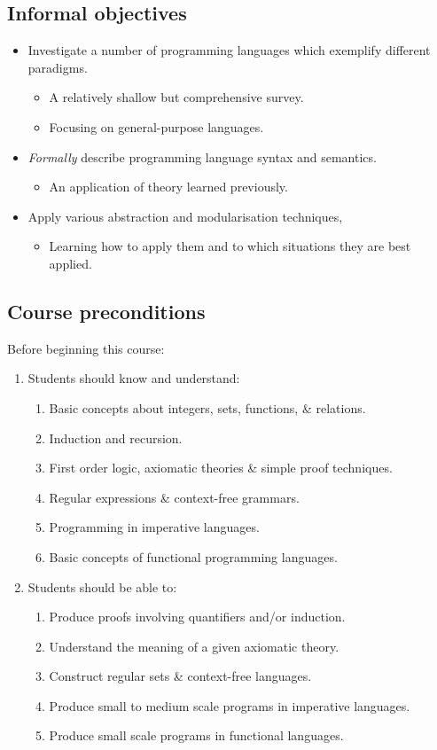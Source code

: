 \documentclass[11pt]{article}
\theoremstyle{definition}
\begin{document}
\subsection{Informal objectives}
\label{sec:org1af5ad8}
\begin{itemize}
\item Investigate a number of programming languages
which exemplify different paradigms.
\begin{itemize}
\item A relatively shallow but comprehensive survey.
\item Focusing on general-purpose languages.
\end{itemize}
\item \emph{Formally} describe programming language syntax and semantics.
\begin{itemize}
\item An application of theory learned previously.
\end{itemize}
\item Apply various abstraction and modularisation techniques,
\begin{itemize}
\item Learning how to apply them and
to which situations they are best applied.
\end{itemize}
\end{itemize}

\subsection{Course preconditions}
\label{sec:org6fd6a6f}
Before beginning this course:

\begin{enumerate}
\item Students should know and understand:
\begin{enumerate}
\item Basic concepts about integers, sets, functions, \& relations.
\item Induction and recursion.
\item First order logic, axiomatic theories \& simple proof techniques.
\item Regular expressions \& context-free grammars.
\item Programming in imperative languages.
\item Basic concepts of functional programming languages.
\end{enumerate}
\item Students should be able to:
\begin{enumerate}
\item Produce proofs involving quantifiers and/or induction.
\item Understand the meaning of a given axiomatic theory.
\item Construct regular sets \& context-free languages.
\item Produce small to medium scale programs in imperative languages.
\item Produce small scale programs in functional languages.
\end{enumerate}
\end{enumerate}
\end{document}
